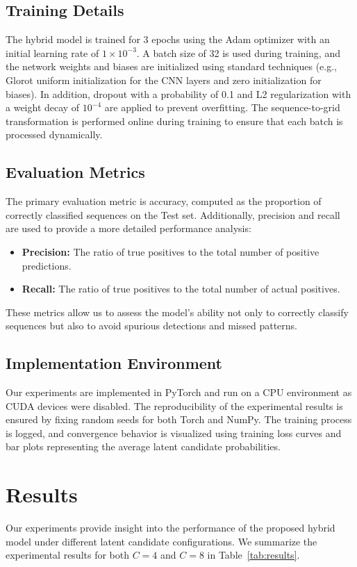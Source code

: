 \documentclass[11pt]{article}
\begin{document}
\subsection{Training Details}
The hybrid model is trained for 3 epochs using the Adam optimizer with an initial learning rate of \(1 \times 10^{-3}\). A batch size of 32 is used during training, and the network weights and biases are initialized using standard techniques (e.g., Glorot uniform initialization for the CNN layers and zero initialization for biases). In addition, dropout with a probability of 0.1 and L2 regularization with a weight decay of \(10^{-4}\) are applied to prevent overfitting. The sequence-to-grid transformation is performed online during training to ensure that each batch is processed dynamically.

\subsection{Evaluation Metrics}
The primary evaluation metric is accuracy, computed as the proportion of correctly classified sequences on the Test set. Additionally, precision and recall are used to provide a more detailed performance analysis:
\begin{itemize}
    \item \textbf{Precision:} The ratio of true positives to the total number of positive predictions.
    \item \textbf{Recall:} The ratio of true positives to the total number of actual positives.
\end{itemize}
These metrics allow us to assess the model’s ability not only to correctly classify sequences but also to avoid spurious detections and missed patterns.

\subsection{Implementation Environment}
Our experiments are implemented in PyTorch and run on a CPU environment as CUDA devices were disabled. The reproducibility of the experimental results is ensured by fixing random seeds for both Torch and NumPy. The training process is logged, and convergence behavior is visualized using training loss curves and bar plots representing the average latent candidate probabilities.

\section{Results}
Our experiments provide insight into the performance of the proposed hybrid model under different latent candidate configurations. We summarize the experimental results for both \(C=4\) and \(C=8\) in Table~\ref{tab:results}.
\end{document}
